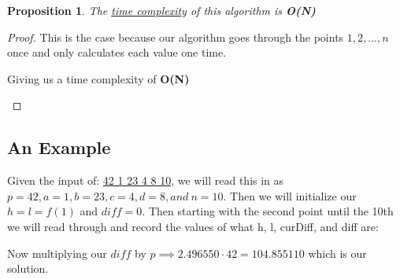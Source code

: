\documentclass[12pt]{article}
\newtheorem{proposition}[theorem]{Proposition}
\begin{document}
\begin{proposition}
\label{numq}
The \underline{time complexity} of this algorithm is \textbf{O(N)}
\end{proposition}

\begin{proof}
This is the case because our algorithm goes through the points $1, 2, ..., n$ once and only
calculates each value one time.
\begin{center}
    Giving us a time complexity of \textbf{O(N)}
\end{center}
\end{proof}


\subsection{An Example}
Given the input of: \underline{42 1 23 4 8 10}, we will read this in as
$p = 42, a = 1, b = 23, c = 4, d = 8, and\ n = 10$. Then we will initialize our $h = l = f(1)$ and $diff = 0$.
Then starting with the second point until the 10th we will read through and record the values of what h, l, curDiff,
and diff are:

\begin{table}[H]
	\centering
\end{table}

Now multiplying our $diff$ by $p \implies 2.496550 \cdot 42 = 104.855110$ which is our solution.


\end{document}
